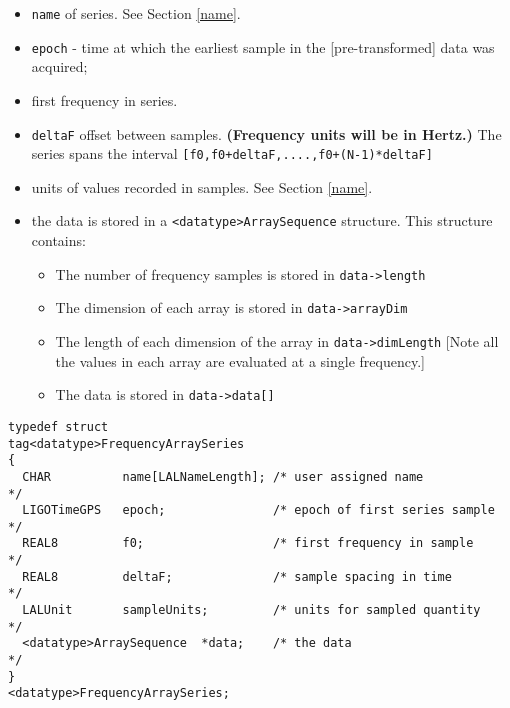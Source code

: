 \documentclass[]{ligodcc}
\begin{document}
\begin{itemize}
\vspace{-0.15in}
\item
{\tt name} of series. See Section \ref{name}.
\vspace{-0.15in}
\item
{\tt epoch}  -  time at which the earliest sample in the [pre-transformed]
data was acquired;
\vspace{-0.15in}
\item
first frequency in series. 
\vspace{-0.15in}
\item
{\tt deltaF} offset between samples.  {\bf (Frequency units will be in Hertz.)}
The series spans the interval {\tt [f0,f0+deltaF,....,f0+(N-1)*deltaF]}
\vspace{-0.15in}
\item
units of values recorded in samples. See Section \ref{name}.
\vspace{-0.15in}
\item
the data is stored in a {\tt <datatype>ArraySequence}  structure. This
structure contains:
\begin{itemize}
\vspace{-0.1in}
\item
The number of frequency  samples is stored in {\tt data->length}
\vspace{-0.1in}
\item
The dimension of each array is stored in {\tt data->arrayDim}
\vspace{-0.1in}
\item
The length of each dimension of the array in {\tt data->dimLength}
[Note all the values in each array are evaluated at a single frequency.]
\vspace{-0.1in}
\item
The data is stored in {\tt data->data[]}
\end{itemize}
\end{itemize}


{\footnotesize
\begin{verbatim}
typedef struct
tag<datatype>FrequencyArraySeries
{
  CHAR          name[LALNameLength]; /* user assigned name           */
  LIGOTimeGPS   epoch;               /* epoch of first series sample */
  REAL8         f0;                  /* first frequency in sample    */
  REAL8         deltaF;              /* sample spacing in time       */
  LALUnit       sampleUnits;         /* units for sampled quantity   */
  <datatype>ArraySequence  *data;    /* the data                     */
}
<datatype>FrequencyArraySeries;
\end{verbatim}}
\end{document}
